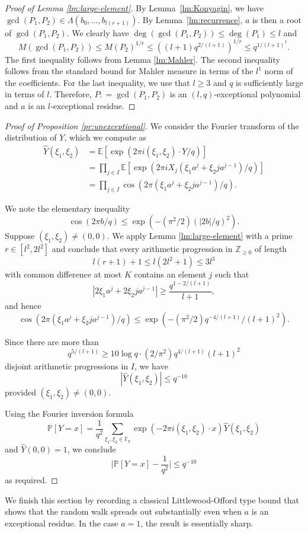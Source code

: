 \documentclass[12pt, notitlepage]{amsart}
\numberwithin{equation}{section}
\def\Z{\mathbb Z}
\def\P{\mathbb P}
\def\F{\mathbb F}
\def\E{\mathbb E}
\newcommand{\wh}{\widehat}
\def\gcd{\operatorname{gcd}}
\theoremstyle{remark}
\theoremstyle{definition}
\theoremstyle{remark}
\numberwithin{equation}{section}
\begin{document}
\begin{proof}[Proof of Lemma \ref{lm:large-element}]
By Lemma~\ref{lm:Konyagin}, we have $\gcd(P_1,P_2)\in\Lambda(b_0,\ldots, b_{l(r+1)})$.
By Lemma~\ref{lm:recurrence}, $a$ is then a root of $\gcd(P_1,P_2)$.
We clearly have $\deg(\gcd(P_1,P_2))\le\deg(P_1)\le l$ and
\[
M(\gcd(P_1,P_2))\le M(P_2)^{1/r}\le ((l+1)q^{2/(l+1)})^{1/r}\le q^{1/(l+1)^2}.
\]
The first inequality follows from Lemma \ref{lm:Mahler}.
The second inequality follows from the standard bound for Mahler measure
in terms of the $l^1$ norm of the coefficients.
For the last inequality, we use that $l\ge 3$ and $q$ is sufficiently large in terms of $l$.
Therefore, $P: = \gcd(P_1,P_2)$ is an $(l,q)$-exceptional polynomial
and $a$ is an $l$-exceptional residue.
\end{proof}

\begin{proof}[Proof of Proposition \ref{pr:unexceptional}]
We consider the Fourier transform of the distribution of $Y$, which we
compute as
\begin{align*}
\wh Y(\xi_1,\xi_2)&=\E[\exp(2\pi i(\xi_1,\xi_2)\cdot Y/q)]\\
&=\prod_{j\in I}\E[\exp(2\pi iX_j(\xi_1 a^j+\xi_2 j a^{j-1})/q)]\\
&=\prod_{j\in I}\cos(2\pi(\xi_1 a^j+\xi_2 j a^{j-1})/q).
\end{align*}

We note the elementary inequality
\[
\cos(2\pi b/q)\le \exp(-(\pi^2/2)(|2b|/q)^2).
\]
Suppose $(\xi_1,\xi_2)\neq(0,0)$.
We apply Lemma \ref{lm:large-element} with a prime $r\in[l^2, 2l^2]$ and conclude that
every arithmetic progression in $\Z_{\ge 0}$
of length
\[
l(r+1)+1\le l(2l^2+1)\le 3l^3
\]
with common difference at most $K$
contains an element $j$ such that
\[
|2\xi_1 a^j+2\xi_2 j a^{j-1}|\ge\frac{q^{1-2/(l+1)}}{l+1},
\]
and hence
\[
\cos(2\pi(\xi_1 a^j+\xi_2 j a^{j-1})/q)\le \exp(-(\pi^2/2)q^{-4/(l+1)}/(l+1)^2).
\]

Since there are more than
\[
q^{5/(l+1)}\ge 10\log q\cdot (2/\pi^2) q^{4/(l+1)}(l+1)^2
\] 
disjoint arithmetic progressions in $I$, we have
\[
|\wh Y(\xi_1,\xi_2)|\le q^{-10}
\]
provided $(\xi_1,\xi_2)\neq(0,0)$.

Using the Fourier inversion formula
\[
\P[Y=x]=\frac{1}{q^2}\sum_{\xi_1,\xi_2\in\F_q}
\exp(-2\pi i(\xi_1,\xi_2)\cdot x)\wh Y(\xi_1,\xi_2)
\]
and $\wh Y(0,0)=1$, we conclude
\[
\Big|\P[Y=x]-\frac{1}{q^2}\Big|\le q^{-10}
\]
as required.
\end{proof}

We finish this section by recording a classical Littlewood-Offord type
bound that shows that the random walk spreads out substantially even when
$a$ is an exceptional residue.
In the case $a=1$, the result is essentially sharp.
\end{document}

